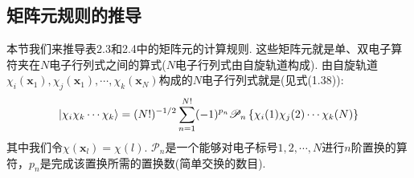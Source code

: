 \subsection{矩阵元规则的推导}
\label{sec2.3.4}
本节我们来推导表2.3和2.4中的矩阵元的计算规则. 这些矩阵元就是单、双电子算符夹在$N$电子行列式之间的算式($N$电子行列式由自旋轨道构成). 由自旋轨道$\chi_i(\mathbf{x}_1),\chi_j(\mathbf{x}_1),\cdots,\chi_k(\mathbf{x}_N)$构成的$N$电子行列式就是(见式(1.38)):
\begin{equation}
\Ket{\chi_i\chi_k\cdots\chi_k}=(N!)^{-1/2}\sum_{n=1}^{N!}(-1)^{p_n}\mathscr{P}_n\left\{\chi_i(1)\chi_j(2)\cdots\chi_k(N) \right\}
\end{equation}
其中我们令$\chi(\mathbf{x}_l)=\chi(l)$. $\mathscr{P}_n$是一个能够对电子标号$1,2,\cdots,N$进行$n$阶置换的算符，$p_n$是完成该置换所需的置换数(简单交换的数目).

